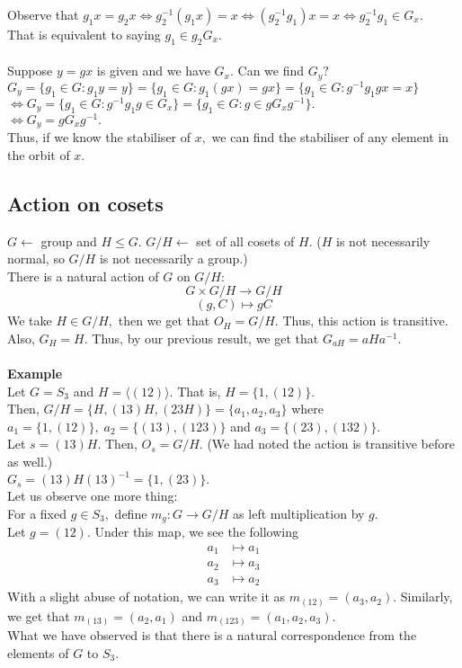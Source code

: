 \documentclass[12 pt, a4paper, toc=graduated, oneside]{article}
\theoremstyle{definition}
\begin{document}
Observe that $g_1x = g_2x \iff g_2^{-1}(g_1x) = x \iff (g_2^{-1}g_1)x = x \iff g_2^{-1}g_1 \in G_x.$\\
That is equivalent to saying $g_1 \in g_2G_x.$\\~\\
Suppose $y = gx$ is given and we have $G_x.$ Can we find $G_y?$\\
$G_y = \{g_1 \in G : g_1 y = y\} = \{g_1 \in G : g_1(gx) = gx\} = \{g_1 \in G : g^{-1}g_1gx = x\}$\\
$\iff G_y = \{g_1 \in G : g^{-1}g_1g \in G_x\} = \{g_1 \in G : g \in gG_xg^{-1}\}.$\\
$\iff G_y = gG_xg^{-1}.$\\
Thus, if we know the stabiliser of $x,$ we can find the stabiliser of any element in the orbit of $x.$

\subsection{Action on cosets}

$G \longleftarrow$ group and $H \le G.$ $G/H \longleftarrow $ set of all cosets of $H$. ($H$ is not necessarily normal, so $G/H$ is not necessarily a group.)\\
There is a natural action of $G$ on $G/H:$
\[G \times G/H \to G/H\]
\[(g, C) \mapsto gC\]
We take $H \in G/H,$ then we get that $O_H = G/H.$ Thus, this action is transitive.\\
Also, $G_H = H.$ Thus, by our previous result, we get that $G_{aH} = aHa^{-1}.$\\~\\
\textbf{Example}\\
Let $G = S_3$ and $H = \langle  (12)\rangle.$ That is, $H = \{1, (12)\}.$\\
Then, $G/H = \{H, (13)H, (23H)\} = \{a_1, a_2, a_3\}$ where $a_1 = \{1, (12)\}, \; a_2 = \{(13), (123)\}$ and $a_3 = \{(23), (132)\}.$\\
Let $s = (13)H.$ Then, $O_s = G/H.$ (We had noted the action is transitive before as well.)\\
$G_s = (13)H(13)^{-1} = \{1, (23)\}.$\\
Let us observe one more thing:\\
For a fixed $g \in S_3,$ define $m_g : G \to G/H$ as left multiplication by $g.$\\
Let $g = (12).$ Under this map, we see the following
\begin{align*}
	a_1 & \mapsto a_1\\
	a_2 & \mapsto a_3\\
	a_3 & \mapsto a_2
\end{align*}
With a slight abuse of notation, we can write it as $m_{(12)} = (a_3, a_2).$
Similarly, we get that $m_{(13)} = (a_2, a_1)$ and $m_{(123)} = (a_1, a_2, a_3).$\\
What we have observed is that there is a natural correspondence from the elements of $G$ to $S_3.$
\end{document}
